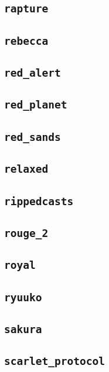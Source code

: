\subsection{\texttt{rapture}}
\newpage
\subsection{\texttt{rebecca}}
\newpage
\subsection{\texttt{red\_alert}}
\newpage
\subsection{\texttt{red\_planet}}
\newpage
\subsection{\texttt{red\_sands}}
\newpage
\subsection{\texttt{relaxed}}
\newpage
\subsection{\texttt{rippedcasts}}
\newpage
\subsection{\texttt{rouge\_2}}
\newpage
\subsection{\texttt{royal}}
\newpage
\subsection{\texttt{ryuuko}}
\newpage
\subsection{\texttt{sakura}}
\newpage
\subsection{\texttt{scarlet\_protocol}}
\newpage
